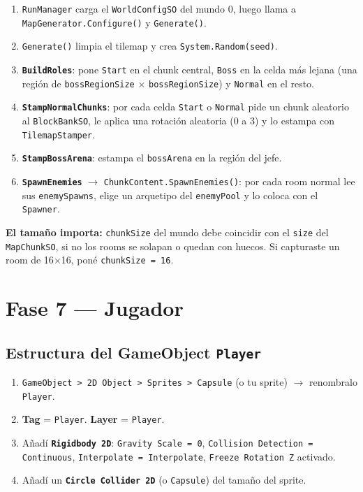 \documentclass[a4paper,12pt]{article}
\newcommand{\code}[1]{\texttt{#1}}
\begin{document}
\begin{enumerate}
    \item \code{RunManager} carga el \code{WorldConfigSO} del mundo 0, luego llama a
    \code{MapGenerator.Configure()} y \code{Generate()}.
    \item \code{Generate()} limpia el tilemap y crea \code{System.Random(seed)}.
    \item \textbf{\code{BuildRoles}}: pone \code{Start} en el chunk central, \code{Boss} en la
    celda más lejana (una región de \code{bossRegionSize} $\times$ \code{bossRegionSize}) y
    \code{Normal} en el resto.
    \item \textbf{\code{StampNormalChunks}}: por cada celda \code{Start} o \code{Normal} pide un
    chunk aleatorio al \code{BlockBankSO}, le aplica una rotación aleatoria (0 a 3) y lo estampa
    con \code{TilemapStamper}.
    \item \textbf{\code{StampBossArena}}: estampa el \code{bossArena} en la región del jefe.
    \item \textbf{\code{SpawnEnemies}} $\to$ \code{ChunkContent.SpawnEnemies()}: por cada room
    normal lee sus \code{enemySpawns}, elige un arquetipo del \code{enemyPool} y lo coloca con el
    \code{Spawner}.
\end{enumerate}

\textbf{El tamaño importa:} \code{chunkSize} del mundo debe coincidir con el \code{size} del
\code{MapChunkSO}, si no los rooms se solapan o quedan con huecos. Si capturaste un room de
16$\times$16, poné \code{chunkSize = 16}.

\section{Fase 7 --- Jugador}

\subsection{Estructura del GameObject \code{Player}}

\begin{enumerate}
    \item \code{GameObject > 2D Object > Sprites > Capsule} (o tu sprite) $\to$ renombralo \code{Player}.
    \item \textbf{Tag} = \code{Player}. \textbf{Layer} = \code{Player}.
    \item Añadí \textbf{\code{Rigidbody 2D}}: \code{Gravity Scale = 0},
    \code{Collision Detection = Continuous}, \code{Interpolate = Interpolate},
    \code{Freeze Rotation Z} activado.
    \item Añadí un \textbf{\code{Circle Collider 2D}} (o \code{Capsule}) del tamaño del sprite.
\end{enumerate}
\end{document}
